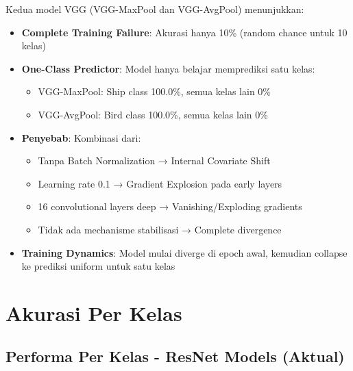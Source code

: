 \documentclass[12pt,a4paper]{report}
\begin{document}
Kedua model VGG (VGG-MaxPool dan VGG-AvgPool) menunjukkan:

\begin{itemize}
    \item \textbf{Complete Training Failure}: Akurasi hanya 10\% (random chance untuk 10 kelas)
    \item \textbf{One-Class Predictor}: Model hanya belajar memprediksi satu kelas:
    \begin{itemize}
        \item VGG-MaxPool: Ship class 100.0\%, semua kelas lain 0\%
        \item VGG-AvgPool: Bird class 100.0\%, semua kelas lain 0\%
    \end{itemize}
    
    \item \textbf{Penyebab}: Kombinasi dari:
    \begin{itemize}
        \item Tanpa Batch Normalization → Internal Covariate Shift
        \item Learning rate 0.1 → Gradient Explosion pada early layers
        \item 16 convolutional layers deep → Vanishing/Exploding gradients
        \item Tidak ada mechanisme stabilisasi → Complete divergence
    \end{itemize}
    
    \item \textbf{Training Dynamics}: Model mulai diverge di epoch awal, kemudian collapse ke prediksi uniform untuk satu kelas
\end{itemize}

\section{Akurasi Per Kelas}

\subsection{Performa Per Kelas - ResNet Models (Aktual)}
\end{document}
